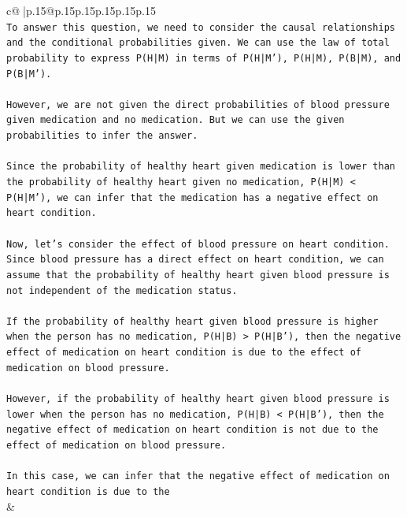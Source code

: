 \documentclass{article}
\begin{document}
{\begin{supertabular}{c@{$\;$}|p{.15\linewidth}@{}p{.15\linewidth}p{.15\linewidth}p{.15\linewidth}p{.15\linewidth}p{.15\linewidth}}
{{{\\ 
\texttt{To answer this question, we need to consider the causal relationships and the conditional probabilities given. We can use the law of total probability to express P(H|M) in terms of P(H|M'), P(H|M), P(B|M), and P(B|M').} \\
\\ 
\texttt{However, we are not given the direct probabilities of blood pressure given medication and no medication. But we can use the given probabilities to infer the answer.} \\
\\ 
\texttt{Since the probability of healthy heart given medication is lower than the probability of healthy heart given no medication, P(H|M) < P(H|M'), we can infer that the medication has a negative effect on heart condition.} \\
\\ 
\texttt{Now, let's consider the effect of blood pressure on heart condition. Since blood pressure has a direct effect on heart condition, we can assume that the probability of healthy heart given blood pressure is not independent of the medication status.} \\
\\ 
\texttt{If the probability of healthy heart given blood pressure is higher when the person has no medication, P(H|B) > P(H|B'), then the negative effect of medication on heart condition is due to the effect of medication on blood pressure.} \\
\\ 
\texttt{However, if the probability of healthy heart given blood pressure is lower when the person has no medication, P(H|B) < P(H|B'), then the negative effect of medication on heart condition is not due to the effect of medication on blood pressure.} \\
\\ 
\texttt{In this case, we can infer that the negative effect of medication on heart condition is due to the} \\
            }
        }
    }
    & \\ \\


\end{supertabular}}
\end{document}
